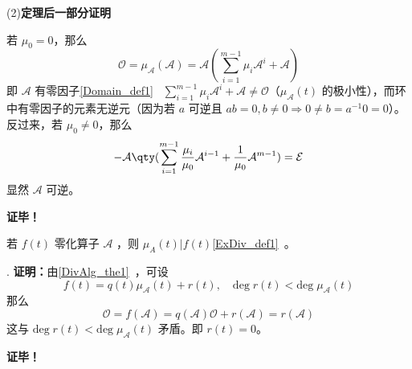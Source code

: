 (2)\textbf{定理后一部分证明}

若 $\mu_0= 0$，那么
\begin{equation}
\mathcal O=\mu_\mathcal{A}(\mathcal A)=\mathcal A(\sum_{i=1}^{m-1}\mu_i\mathcal A^i+\mathcal{A})
\end{equation}
即 $\mathcal{A}$ 有零因子\autoref{Domain_def1}~ $\sum\limits_{i=1}^{m-1}\mu_i\mathcal A^i+\mathcal{A}\neq \mathcal O$（$\mu_\mathcal{A}(t)$ 的极小性），而环中有零因子的元素无逆元（因为若 $a$ 可逆且 $ab=0,b\neq 0\Rightarrow 0\neq b=a^{-1}0=0$）。反过来，若 $\mu_0\neq0$，那么
\begin{equation}
-\mathcal{A}\qty(\sum_{i=1}^{m-1}\frac{\mu_i}{\mu_0}\mathcal A^{i-1}+\frac{1}{\mu_0}\mathcal A^{m-1})=\mathcal{E}
\end{equation}
显然 $\mathcal{A}$ 可逆。

\textbf{证毕！}
\begin{theorem}{}
若 $f(t)$ 零化算子 $\mathcal A$ ，则 $\mu_{A}(t)|f(t)$\autoref{ExDiv_def1}~。
\end{theorem}.
\textbf{证明：}由\autoref{DivAlg_the1}~，可设 
\begin{equation}
f(t)=q(t)\mu_\mathcal{A}(t)+r(t),\quad\mathrm{deg}\;r(t)<\mathrm{deg}\;\mu_{\mathcal{A}}(t)
\end{equation}
那么
\begin{equation}
\mathcal O=f(\mathcal A)=q(\mathcal A)\mathcal O+r(\mathcal A)=r(\mathcal A)
\end{equation}
这与 $\mathrm{deg}\;r(t)<\mathrm{deg}\;\mu_{\mathcal A}(t)$ 矛盾。即 $r(t)=0$。

\textbf{证毕！}